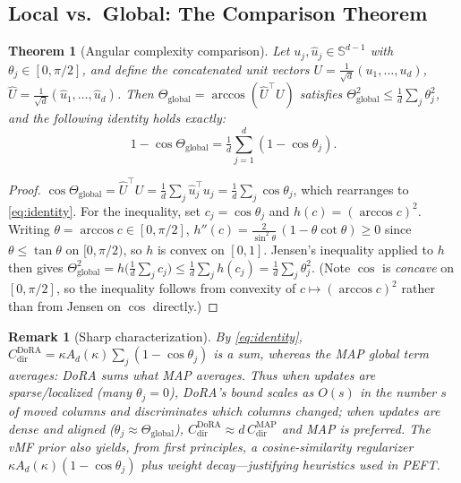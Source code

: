 \documentclass[11pt]{article}
\newtheorem{theorem}{Theorem}
\newtheorem{remark}{Remark}
\newcommand{\Sd}{\mathbb{S}^{d-1}}
\newcommand{\Thetaglob}{\Theta_{\mathrm{global}}}
\begin{document}
\subsection{Local vs.\ Global: The Comparison Theorem}
\begin{theorem}[Angular complexity comparison]\label{thm:comparison}
Let $u_j,\hat u_j\in\Sd$ with $\theta_j\in[0,\pi/2]$, and define the concatenated unit
vectors $U=\frac1{\sqrt d}(u_1,\dots,u_d)$, $\hat U=\frac1{\sqrt d}(\hat u_1,\dots,\hat u_d)$.
Then $\Thetaglob=\arccos(\hat U^\top U)$ satisfies $\Thetaglob^2\le\frac1d\sum_j\theta_j^2$,
and the following identity holds \emph{exactly}:
\begin{equation}\label{eq:identity}
1-\cos\Thetaglob=\tfrac1d\textstyle\sum_{j=1}^d(1-\cos\theta_j).
\end{equation}
\end{theorem}
\begin{proof}
$\cos\Thetaglob=\hat U^\top U=\frac1d\sum_j\hat u_j^\top u_j=\frac1d\sum_j\cos\theta_j$,
which rearranges to \eqref{eq:identity}. For the inequality, set $c_j=\cos\theta_j$ and
$h(c)=(\arccos c)^2$. Writing $\theta=\arccos c\in[0,\pi/2]$,
$h''(c)=\frac{2}{\sin^2\theta}\,(1-\theta\cot\theta)\ge0$ since $\theta\le\tan\theta$ on
$[0,\pi/2)$, so $h$ is convex on $[0,1]$. Jensen's inequality applied to $h$ then gives
$\Thetaglob^2=h\!\big(\tfrac1d\sum_j c_j\big)\le\tfrac1d\sum_j h(c_j)=\tfrac1d\sum_j\theta_j^2$.
(Note $\cos$ is \emph{concave} on $[0,\pi/2]$, so the inequality follows from convexity of
$c\mapsto(\arccos c)^2$ rather than from Jensen on $\cos$ directly.)
\end{proof}

\begin{remark}[Sharp characterization]
By \eqref{eq:identity}, $C^{\mathrm{DoRA}}_{\mathrm{dir}}=\kappa A_d(\kappa)\sum_j(1-\cos\theta_j)$
is a \emph{sum}, whereas the MAP global term averages: DoRA sums what MAP averages.
Thus when updates are \emph{sparse/localized} (many $\theta_j\!=\!0$), DoRA's bound
scales as $O(s)$ in the number $s$ of moved columns and discriminates which columns
changed; when updates are \emph{dense and aligned} ($\theta_j\approx\Thetaglob$),
$C^{\mathrm{DoRA}}_{\mathrm{dir}}\approx d\,C^{\mathrm{MAP}}_{\mathrm{dir}}$ and MAP is
preferred. The vMF prior also yields, from first principles, a cosine-similarity
regularizer $\kappa A_d(\kappa)(1-\cos\theta_j)$ plus weight decay---justifying
heuristics used in PEFT.
\end{remark}

\end{document}
